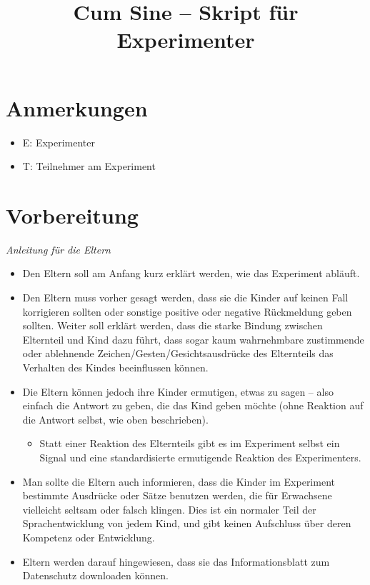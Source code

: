 \documentclass[11pt, oneside]{article}   	%
\title{Cum Sine -- Skript f\"ur Experimenter}
\author{}
\date{}							%
\begin{document}
\maketitle

\section{Anmerkungen}

\begin{itemize}
\item{E: Experimenter} 
\item{T: Teilnehmer am Experiment}
\end{itemize}



\section{Vorbereitung}
{\it Anleitung f\"ur die Eltern}
\begin{itemize}
\item  Den Eltern soll am Anfang kurz erkl\"art werden, wie das Experiment abl\"auft.
\item  Den Eltern muss vorher gesagt werden, dass sie die Kinder auf keinen Fall korrigieren sollten oder sonstige positive oder negative R\"uckmeldung geben sollten. Weiter soll erkl\"art werden, dass die starke Bindung zwischen Elternteil und Kind dazu f\"uhrt, dass sogar kaum wahrnehmbare zustimmende oder ablehnende Zeichen/Gesten/Gesichtsausdr\"ucke des Elternteils das Verhalten des Kindes beeinflussen k\"onnen. 
\item Die Eltern k\"onnen jedoch ihre Kinder  ermutigen, etwas zu sagen  -- also einfach die Antwort zu geben, die das Kind geben m\"ochte (ohne Reaktion auf die Antwort selbst, wie oben beschrieben).
\begin{itemize}
\item 
Statt einer Reaktion des Elternteils gibt es im Experiment selbst ein Signal und eine standardisierte ermutigende Reaktion des Experimenters. 
\end{itemize}
\item Man sollte die Eltern auch informieren,  dass die Kinder im Experiment bestimmte Ausdr\"ucke oder S\"atze benutzen werden, die f\"ur Erwachsene vielleicht seltsam oder falsch klingen. Dies ist ein normaler Teil der Sprachentwicklung von jedem Kind, und gibt keinen Aufschluss \"uber deren Kompetenz oder Entwicklung. 
\item Eltern werden darauf hingewiesen, dass sie das Informationsblatt zum Datenschutz downloaden können.
\end{itemize}
\end{document}
